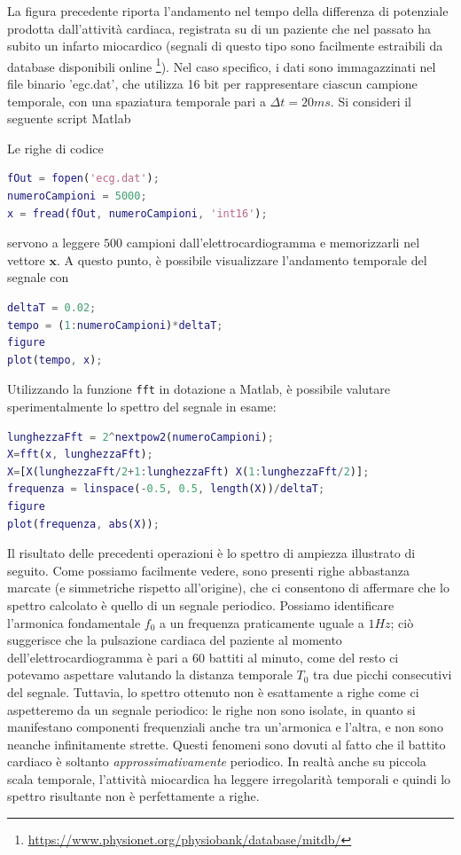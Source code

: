 \documentclass[12pt,oneside,openany]{memoir}
\numberwithin{equation}{subsection}
\begin{document}
La figura precedente riporta l'andamento nel tempo della differenza di potenziale prodotta dall'attivit\`a cardiaca, registrata su di un paziente che nel passato ha subito un infarto miocardico (segnali di questo tipo sono facilmente estraibili da database disponibili online \footnote{\href{https://www.physionet.org/physiobank/database/mitdb/}{https://www.physionet.org/physiobank/database/mitdb/}}). Nel caso specifico, i dati sono immagazzinati nel file binario 'egc.dat', che utilizza 16 bit per rappresentare ciascun campione temporale, con una spaziatura temporale pari a $\Delta t = 20 ms$. Si consideri il seguente script Matlab

Le righe di codice
\begin{lstlisting}[frame=single, language=Matlab]
fOut = fopen('ecg.dat');
numeroCampioni = 5000;
x = fread(fOut, numeroCampioni, 'int16');
\end{lstlisting}
servono a leggere $500$ campioni dall'elettrocardiogramma e memorizzarli nel vettore $\boldsymbol{x}$. A questo punto, \`e possibile visualizzare l'andamento temporale del segnale con
\begin{lstlisting}[frame=single, language=Matlab]
deltaT = 0.02;
tempo = (1:numeroCampioni)*deltaT;
figure
plot(tempo, x);
\end{lstlisting}
Utilizzando la funzione \texttt{fft} in dotazione a Matlab, \`e possibile valutare sperimentalmente lo spettro del segnale in esame:
\begin{lstlisting}[frame=single, language=Matlab]
lunghezzaFft = 2^nextpow2(numeroCampioni);
X=fft(x, lunghezzaFft);
X=[X(lunghezzaFft/2+1:lunghezzaFft) X(1:lunghezzaFft/2)];
frequenza = linspace(-0.5, 0.5, length(X))/deltaT;
figure
plot(frequenza, abs(X));
\end{lstlisting}
Il risultato delle precedenti operazioni \`e lo spettro di ampiezza illustrato di seguito. Come possiamo facilmente vedere, sono presenti righe abbastanza marcate (e simmetriche rispetto all'origine), che ci consentono di affermare che lo spettro calcolato \`e quello di un segnale periodico. Possiamo identificare l'armonica fondamentale $f_0$ a un frequenza praticamente uguale a $1 Hz$; ci\`o suggerisce che la pulsazione cardiaca del paziente al momento dell'elettrocardiogramma \`e pari a $60$ battiti al minuto, come del resto ci potevamo aspettare valutando la distanza temporale $T_0$ tra due picchi consecutivi del segnale. Tuttavia, lo spettro ottenuto non \`e esattamente a righe come ci aspetteremo da un segnale periodico: le righe non sono isolate, in quanto si manifestano componenti frequenziali anche tra un'armonica e l'altra, e non sono neanche infinitamente strette. Questi fenomeni sono dovuti al fatto che il battito cardiaco \`e soltanto \textit{approssimativamente} periodico. In realt\`a anche su piccola scala temporale, l'attivit\`a miocardica ha leggere irregolarit\`a temporali e quindi lo spettro risultante non \`e perfettamente a righe.
\end{document}
